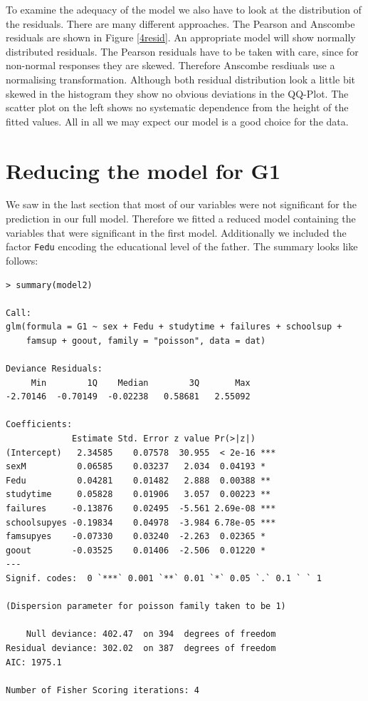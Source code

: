 To examine the adequacy of the model we also have to look at the distribution of the residuals. There are many different approaches. The Pearson and Anscombe residuals are shown in Figure \ref{4resid}. An appropriate model will show normally distributed residuals. The Pearson residuals have to be taken with care, since for non-normal responses they are skewed. Therefore Anscombe resdiuals use a normalising transformation. Although both residual distribution look a little bit skewed in the histogram they show no obvious deviations in the QQ-Plot. The scatter plot on the left shows no systematic dependence from the height of the fitted values. All in all we may expect our model is a good choice for the data. 

\section{Reducing the model for G1}
We saw in the last section that most of our variables were not significant for the prediction in our full model. Therefore we fitted a reduced model containing the variables that were significant in the first model. Additionally we included the factor \texttt{Fedu} encoding the educational level of the father. The summary looks like follows:
\begin{small}\begin{verbatim} 
> summary(model2)

Call:
glm(formula = G1 ~ sex + Fedu + studytime + failures + schoolsup + 
    famsup + goout, family = "poisson", data = dat)

Deviance Residuals: 
     Min        1Q    Median        3Q       Max  
-2.70146  -0.70149  -0.02238   0.58681   2.55092  

Coefficients:
             Estimate Std. Error z value Pr(>|z|)    
(Intercept)   2.34585    0.07578  30.955  < 2e-16 ***
sexM          0.06585    0.03237   2.034  0.04193 *  
Fedu          0.04281    0.01482   2.888  0.00388 ** 
studytime     0.05828    0.01906   3.057  0.00223 ** 
failures     -0.13876    0.02495  -5.561 2.69e-08 ***
schoolsupyes -0.19834    0.04978  -3.984 6.78e-05 ***
famsupyes    -0.07330    0.03240  -2.263  0.02365 *  
goout        -0.03525    0.01406  -2.506  0.01220 *  
---
Signif. codes:  0 `***` 0.001 `**` 0.01 `*` 0.05 `.` 0.1 ` ` 1

(Dispersion parameter for poisson family taken to be 1)

    Null deviance: 402.47  on 394  degrees of freedom
Residual deviance: 302.02  on 387  degrees of freedom
AIC: 1975.1

Number of Fisher Scoring iterations: 4
\end{verbatim}\end{small}  

